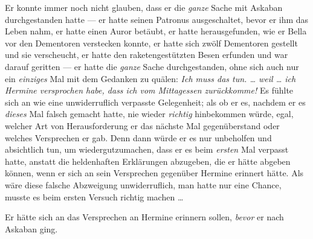 Er konnte immer noch nicht glauben, dass er die \emph{ganze} Sache mit Askaban durchgestanden hatte — er hatte seinen Patronus ausgeschaltet, bevor er ihm das Leben nahm, er hatte einen Auror betäubt, er hatte herausgefunden, wie er Bella vor den Dementoren verstecken konnte, er hatte sich zwölf Dementoren gestellt und sie verscheucht, er hatte den raketengestützten Besen erfunden und war darauf geritten — er hatte die \emph{ganze} Sache durchgestanden, ohne sich auch nur ein \emph{einziges} Mal mit dem Gedanken zu quälen: \emph{Ich muss das tun. … weil … ich Hermine versprochen habe, dass ich vom Mittagessen zurückkomme!} Es fühlte sich an wie eine unwiderruflich verpasste Gelegenheit; als ob er es, nachdem er es \emph{dieses} Mal falsch gemacht hatte, nie wieder \emph{richtig} hinbekommen würde, egal, welcher Art von Herausforderung er das nächste Mal gegenüberstand oder welches Versprechen er gab. Denn dann würde er es nur unbeholfen und absichtlich tun, um wiedergutzumachen, dass er es beim \emph{ersten} Mal verpasst hatte, anstatt die heldenhaften Erklärungen abzugeben, die er hätte abgeben können, wenn er sich an sein Versprechen gegenüber Hermine erinnert hätte. Als wäre diese falsche Abzweigung unwiderruflich, man hatte nur eine Chance, musste es beim ersten Versuch richtig machen …

Er hätte sich an das Versprechen an Hermine erinnern sollen, \emph{bevor} er nach Askaban ging.

